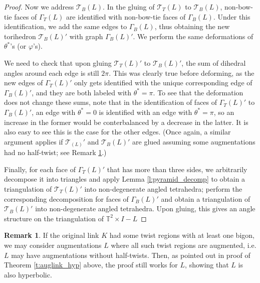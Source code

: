\documentclass[11pt]{amsart}
\newcommand{\thmref}[1]{Theorem \ref{#1}}
\newcommand{\lemref}[1]{Lemma \ref{#1}}
\newcommand{\remref}[1]{Remark \ref{#1}}
\newcommand{\torus}{{\mathbb{T}^2}}
\newcommand{\sT}{{\mathcal{T}}}
\newcommand{\vphi}{\varphi}
\newcommand{\toruscomp}[1]{{\torus \times I - #1}}
\theoremstyle{plain}
\theoremstyle{definition}
\newtheorem{remark}[theorem]{Remark}
\begin{document}
\begin{proof}
Now we address $\sT_B(L)$.
In the gluing of $\sT_T(L)$ to $\sT_B(L)$,
non-bow-tie faces of $\Gamma_T(L)$ are identified with
non-bow-tie faces of $\Gamma_B(L)$.
Under this identification, we add the same edges to $\Gamma_B(L)$,
thus obtaining the new torihedron $\sT_B(L)'$ with graph
$\Gamma_B(L)'$.
We perform the same deformations of $\theta^*$'s (or $\vphi$'s).


We need to check that upon gluing $\sT_T(L)'$ to $\sT_B(L)'$,
the sum of dihedral angles around each edge is still $2\pi$.
This was clearly true before deforming, as the new edges of
$\Gamma_T(L)'$ only gets identified with the unique
corresponding edge of $\Gamma_B(L)'$, and they are both labeled
with $\theta^* = \pi$.
To see that the deformation does not change these sums,
note that in the identification of faces of $\Gamma_T(L)'$
to $\Gamma_B(L)'$,
an edge with $\theta^*=0$ is identified with an edge with
$\theta^*=\pi$,
so an increase in the former would be conterbalanced by
a decrease in the latter.
It is also easy to see this is the case for the other edges.
(Once again, a similar argument applies if $\sT_(L)'$
and $\sT_B(L)'$ are glued assuming
some augmentations had no half-twist; see \remref{r:nohalftwist}.)


Finally, for each face of $\Gamma_T(L)'$ that has more than three sides,
we arbitrarily decompose it into triangles
and apply \lemref{l:pyramid_decomp}
to obtain a triangulation of $\sT_T(L)'$ into non-degenerate angled tetrahedra;
perform the corresponding decomposition for faces of
$\Gamma_B(L)'$ and obtain a triangulation of $\sT_B(L)'$
into non-degenerate angled tetrahedra.
Upon gluing, this gives an angle structure on the triangulation
of $\toruscomp{L}$
\end{proof}



\begin{remark}
\label{r:nohalftwist}
If the original link $K$ had some twist regions with at least one bigon,
we may consider augmentations $L$ where all such twist regions
are augmented, i.e. $L$ may have augmentations without half-twists.
Then, as pointed out in proof of \thmref{t:auglink_hyp} above,
the proof still works for $L$, showing that $L$ is also hyperbolic.
\end{remark}








\end{document}

